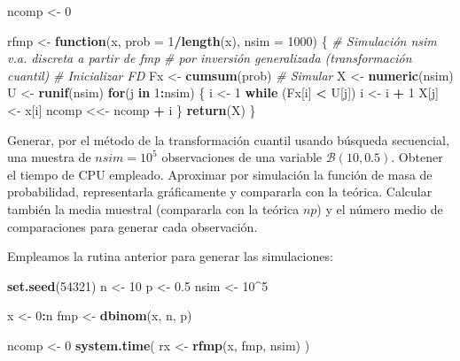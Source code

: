 \documentclass[]{book}
\newenvironment{Shaded}{\begin{snugshade}}{\end{snugshade}}
\newcommand{\KeywordTok}[1]{\textcolor[rgb]{0.13,0.29,0.53}{\textbf{#1}}}
\newcommand{\DataTypeTok}[1]{\textcolor[rgb]{0.13,0.29,0.53}{#1}}
\newcommand{\DecValTok}[1]{\textcolor[rgb]{0.00,0.00,0.81}{#1}}
\newcommand{\FloatTok}[1]{\textcolor[rgb]{0.00,0.00,0.81}{#1}}
\newcommand{\StringTok}[1]{\textcolor[rgb]{0.31,0.60,0.02}{#1}}
\newcommand{\CommentTok}[1]{\textcolor[rgb]{0.56,0.35,0.01}{\textit{#1}}}
\newcommand{\ControlFlowTok}[1]{\textcolor[rgb]{0.13,0.29,0.53}{\textbf{#1}}}
\newcommand{\OperatorTok}[1]{\textcolor[rgb]{0.81,0.36,0.00}{\textbf{#1}}}
\newcommand{\NormalTok}[1]{#1}
\theoremstyle{definition}
\theoremstyle{definition}
\theoremstyle{definition}
\theoremstyle{remark}
\let\BeginKnitrBlock\begin \let\EndKnitrBlock\end
\begin{document}
\begin{Shaded}
\begin{Highlighting}[]
\NormalTok{ncomp <-}\StringTok{ }\DecValTok{0}

\NormalTok{rfmp <-}\StringTok{ }\ControlFlowTok{function}\NormalTok{(x, }\DataTypeTok{prob =} \DecValTok{1}\OperatorTok{/}\KeywordTok{length}\NormalTok{(x), }\DataTypeTok{nsim =} \DecValTok{1000}\NormalTok{) \{}
  \CommentTok{# Simulación nsim v.a. discreta a partir de fmp}
  \CommentTok{# por inversión generalizada (transformación cuantil)}
  \CommentTok{# Inicializar FD}
\NormalTok{  Fx <-}\StringTok{ }\KeywordTok{cumsum}\NormalTok{(prob)}
  \CommentTok{# Simular}
\NormalTok{  X <-}\StringTok{ }\KeywordTok{numeric}\NormalTok{(nsim)}
\NormalTok{  U <-}\StringTok{ }\KeywordTok{runif}\NormalTok{(nsim)}
  \ControlFlowTok{for}\NormalTok{(j }\ControlFlowTok{in} \DecValTok{1}\OperatorTok{:}\NormalTok{nsim) \{}
\NormalTok{    i <-}\StringTok{ }\DecValTok{1}
    \ControlFlowTok{while}\NormalTok{ (Fx[i] }\OperatorTok{<}\StringTok{ }\NormalTok{U[j]) i <-}\StringTok{ }\NormalTok{i }\OperatorTok{+}\StringTok{ }\DecValTok{1}
\NormalTok{    X[j] <-}\StringTok{ }\NormalTok{x[i]}
\NormalTok{    ncomp <<-}\StringTok{ }\NormalTok{ncomp }\OperatorTok{+}\StringTok{ }\NormalTok{i}
\NormalTok{  \}}
  \KeywordTok{return}\NormalTok{(X)}
\NormalTok{\}}
\end{Highlighting}
\end{Shaded}

\BeginKnitrBlock{exercise}
\protect\hypertarget{exr:unnamed-chunk-10}{}{\label{exr:unnamed-chunk-10} }
\EndKnitrBlock{exercise}

Generar, por el método de la transformación cuantil usando búsqueda
secuencial, una muestra de \(nsim=10^{5}\) observaciones de una variable
\(\mathcal{B}(10,0.5)\). Obtener el tiempo de CPU empleado. Aproximar
por simulación la función de masa de probabilidad, representarla
gráficamente y compararla con la teórica. Calcular también la media
muestral (compararla con la teórica \(np\)) y el número medio de
comparaciones para generar cada observación.

Empleamos la rutina anterior para generar las simulaciones:

\begin{Shaded}
\begin{Highlighting}[]
\KeywordTok{set.seed}\NormalTok{(}\DecValTok{54321}\NormalTok{)}
\NormalTok{n <-}\StringTok{ }\DecValTok{10}
\NormalTok{p <-}\StringTok{ }\FloatTok{0.5}
\NormalTok{nsim <-}\StringTok{ }\DecValTok{10}\OperatorTok{^}\DecValTok{5}

\NormalTok{x <-}\StringTok{ }\DecValTok{0}\OperatorTok{:}\NormalTok{n}
\NormalTok{fmp <-}\StringTok{ }\KeywordTok{dbinom}\NormalTok{(x, n, p)}

\NormalTok{ncomp <-}\StringTok{ }\DecValTok{0}
\KeywordTok{system.time}\NormalTok{( rx <-}\StringTok{ }\KeywordTok{rfmp}\NormalTok{(x, fmp, nsim) )}
\end{Highlighting}
\end{Shaded}
\end{document}
